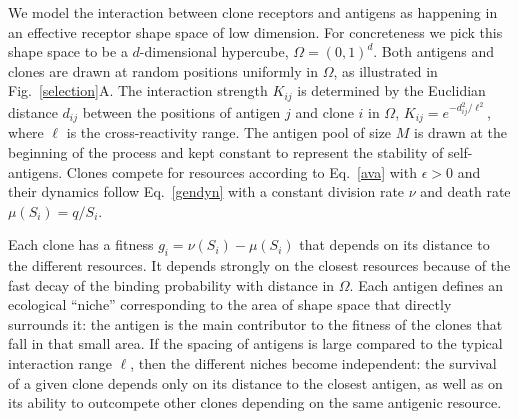 \documentclass[aps,pre,twocolumn,superscriptaddress,groupedaddress]{revtex4}
\newcommand{\<}{\langle}
\renewcommand{\>}{\rangle}
\begin{document}
We model the interaction between clone receptors and antigens as happening in an effective receptor shape space of low dimension. For concreteness we pick this shape space to be a $d$-dimensional hypercube, $\Omega=(0,1)^d$. Both antigens and clones are drawn at random positions uniformly in $\Omega$, as illustrated in Fig.~\ref{selection}A. The interaction strength $K_{ij}$ is determined by the Euclidian distance $d_{ij}$ between the positions of antigen $j$ and clone $i$ in $\Omega$,  $K_{ij}=e^{-d_{ij}^2/\ell^2}$, where $\ell$ is the cross-reactivity range. The antigen pool of size $M$ is drawn at the beginning of the process and kept constant to represent the stability of self-antigens. Clones compete for resources according to Eq.~\ref{ava} with $\epsilon>0$ and their dynamics follow Eq.~\ref{gendyn} with a constant division rate $\nu$ and death rate $\mu(S_i)=q/S_i$. 
 
Each clone has a fitness $g_i=\nu(S_i)-\mu(S_i)$ that depends on its distance to the different resources. It depends strongly on the closest resources because of the fast decay of the binding probability with distance in $\Omega$. Each antigen defines an ecological ``niche'' corresponding to the area of shape space that directly surrounds it: the antigen is the main contributor to the fitness of the clones that fall in that small area. If the spacing of antigens is large compared to the typical interaction range $\ell$, then the different niches become independent: the survival of a given clone depends only on its distance to the closest antigen, as well as on its ability to outcompete other clones depending on the same antigenic resource. 
\end{document}
